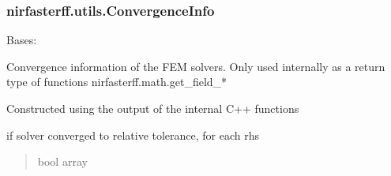 \documentclass[letterpaper,10pt,english]{sphinxmanual}
\begin{document}
\sphinxstepscope


\subsubsection{nirfasterff.utils.ConvergenceInfo}
\label{\detokenize{_autosummary/nirfasterff.utils.ConvergenceInfo:nirfasterff-utils-convergenceinfo}}\label{\detokenize{_autosummary/nirfasterff.utils.ConvergenceInfo::doc}}

\begin{fulllineitems}
\label{\detokenize{_autosummary/nirfasterff.utils.ConvergenceInfo:nirfasterff.utils.ConvergenceInfo}}
\pysigstartsignatures
\pysiglinewithargsret
{}
{}
{}
\pysigstopsignatures
\sphinxAtStartPar
Bases: 

\sphinxAtStartPar
Convergence information of the FEM solvers. Only used internally as a return type of functions nirfasterff.math.get\_field\_*

\sphinxAtStartPar
Constructed using the output of the internal C++ functions

\begin{fulllineitems}
\label{\detokenize{_autosummary/nirfasterff.utils.ConvergenceInfo:nirfasterff.utils.ConvergenceInfo.isConverged}}
\pysigstartsignatures
\pysigline
{}
\pysigstopsignatures
\sphinxAtStartPar
if solver converged to relative tolerance, for each rhs
\begin{quote}\begin{description}
\sphinxAtStartPar
bool array

\end{description}\end{quote}

\end{fulllineitems}



\end{fulllineitems}
\end{document}
